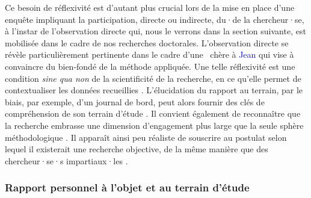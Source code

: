 \begin{refsegment}
Ce besoin de réflexivité est d'autant plus crucial lors de la mise en place d'une enquête impliquant la participation, directe ou indirecte, du·de la chercheur·se, à l'instar de l'observation directe qui, nous le verrons dans la section suivante, est mobilisée dans le cadre de nos recherches doctorales. L'observation directe se révèle particulièrement pertinente dans le cadre d'une ~chère à \textcolor{blue}{Jean} \textcolor{blue}{\textcite[33]{peneff_mesure_1995}} qui vise à convaincre du bien-fondé de la méthode appliquée. Une telle réflexivité est une condition \textsl{sine qua non} de la scientificité de la recherche, en ce qu'elle permet de contextualiser les données recueillies \textcolor{blue}{\autocite[106]{chevalier_lobservation_2018}}. L'élucidation du rapport au terrain, par le biais, par exemple, d'un journal de bord, peut alors fournir des clés de compréhension de son terrain d'étude \textcolor{blue}{\autocite[]{revillard_observation_2018}}. Il convient également de reconnaître que la recherche embrasse une dimension d'engagement plus large que la seule sphère méthodologique \textcolor{blue}{\autocite[70]{opillard_we_2018}}. Il apparaît ainsi peu réaliste de souscrire au postulat selon lequel il existerait une recherche objective, de la même manière que des chercheur·se·s impartiaux·les \textcolor{blue}{\autocite[]{pincon_grande_2011}}.%

\subsubsection*{Rapport personnel à l'objet et au terrain d'étude
    \label{chap3:application-auto-analyse-sociologique}
    }


\end{refsegment}
